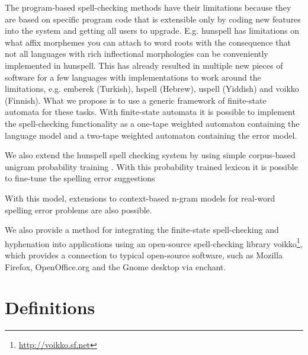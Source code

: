 \documentclass[postprint]{flammie}
\begin{document}
The program-based spell-checking methods have their limitations
because they are based on specific program code that is extensible
only by coding new features into the system and getting all users to
upgrade. E.g. hunspell has limitations on what affix morphemes you can
attach to word roots with the consequence that not all languages with
rich inflectional morphologies can be conveniently implemented in
hunspell. This has already resulted in multiple new pieces of software
for a few languages with implementations to work around the
limitations, e.g.  emberek (Turkish), hspell (Hebrew), uspell
(Yiddish) and voikko (Finnish). What we propose is to use a generic
framework of finite-state automata for these tasks. With finite-state
automata it is possible to implement the spell-checking functionality
as a one-tape weighted automaton containing the language model and a
two-tape weighted automaton containing the error model.

We also extend the hunspell spell checking system by using simple corpus-based
unigram probability training \cite{pirinen2010finitestate}. With this probability
trained lexicon it is possible to fine-tune the spelling error suggestions 

With this model, extensions to
context-based n-gram models for real-word spelling error problems
\cite{wilcox-ohearn2008realword} are also possible.

We also provide a method for integrating the finite-state spell-checking
and hyphenation into applications using an open-source spell-checking
library voikko\footnote{\url{http://voikko.sf.net}}, which provides a
connection to typical open-source software, such as Mozilla Firefox,
OpenOffice.org and the Gnome desktop via enchant.

\section{Definitions}
\label{sec:definitions}
\end{document}

